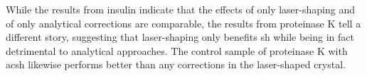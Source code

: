 While the results from insulin indicate that the effects of only laser-shaping and of only analytical corrections are comparable, the results from proteinase K tell a different story, suggesting that laser-shaping only benefits \ac{sh} while being in fact detrimental to analytical approaches. The control sample of proteinase K with \ac{acsh} likewise performs better than any corrections in the laser-shaped crystal. %








